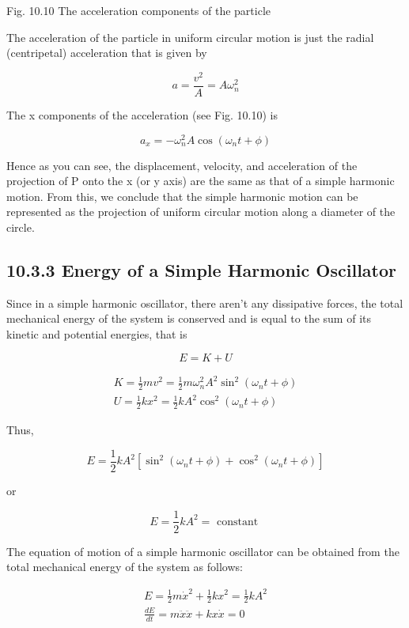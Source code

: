 \documentclass[10pt]{article}
\begin{document}
Fig. 10.10 The acceleration components of the particle

The acceleration of the particle in uniform circular motion is just the radial (centripetal) acceleration that is given by

$$
a=\frac{v^{2}}{A}=A \omega_{n}^{2}
$$

The x components of the acceleration (see Fig. 10.10) is

$$
a_{x}=-\omega_{n}^{2} A \cos \left(\omega_{n} t+\phi\right)
$$

Hence as you can see, the displacement, velocity, and acceleration of the projection of P onto the x (or y axis) are the same as that of a simple harmonic motion. From this, we conclude that the simple harmonic motion can be represented as the projection of uniform circular motion along a diameter of the circle.

\subsection*{10.3.3 Energy of a Simple Harmonic Oscillator}
Since in a simple harmonic oscillator, there aren't any dissipative forces, the total mechanical energy of the system is conserved and is equal to the sum of its kinetic and potential energies, that is

$$
E=K+U
$$

$$
\begin{gathered}
K=\frac{1}{2} m v^{2}=\frac{1}{2} m \omega_{n}^{2} A^{2} \sin ^{2}\left(\omega_{n} t+\phi\right) \\
U=\frac{1}{2} k x^{2}=\frac{1}{2} k A^{2} \cos ^{2}\left(\omega_{n} t+\phi\right)
\end{gathered}
$$

Thus,

$$
E=\frac{1}{2} k A^{2}\left[\sin ^{2}\left(\omega_{n} t+\phi\right)+\cos ^{2}\left(\omega_{n} t+\phi\right)\right]
$$

or

$$
E=\frac{1}{2} k A^{2}=\text { constant }
$$

The equation of motion of a simple harmonic oscillator can be obtained from the total mechanical energy of the system as follows:


\begin{gather*}
E=\frac{1}{2} m \dot{x}^{2}+\frac{1}{2} k x^{2}=\frac{1}{2} k A^{2}  \tag{10.10}\\
\frac{d E}{d t}=m \ddot{x} \ddot{x}+k x \dot{x}=0
\end{gather*}
\end{document}
